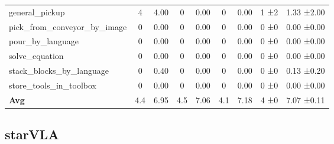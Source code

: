\begin{table}[H]
{\begin{tabular}{l|c|c|c|c|c|c|c|c}
general\_pickup & 4 & 4.00 & 0 & 0.00 & 0 & 0.00 & 1 ±2 & 1.33 ±2.00 \\
pick\_from\_conveyor\_by\_image & 0 & 0.00 & 0 & 0.00 & 0 & 0.00 & 0 ±0 & 0.00 ±0.00 \\
pour\_by\_language & 0 & 0.00 & 0 & 0.00 & 0 & 0.00 & 0 ±0 & 0.00 ±0.00 \\
solve\_equation & 0 & 0.00 & 0 & 0.00 & 0 & 0.00 & 0 ±0 & 0.00 ±0.00 \\
stack\_blocks\_by\_language & 0 & 0.40 & 0 & 0.00 & 0 & 0.00 & 0 ±0 & 0.13 ±0.20 \\
store\_tools\_in\_toolbox & 0 & 0.00 & 0 & 0.00 & 0 & 0.00 & 0 ±0 & 0.00 ±0.00 \\
\hline
\textbf{Avg} & 4.4 & 6.95 & 4.5 & 7.06 & 4.1 & 7.18 & 4 ±0 & 7.07 ±0.11 \\
\hline
\end{tabular}
}
\end{table}
\subsection{starVLA}
\label{part:starvla}

